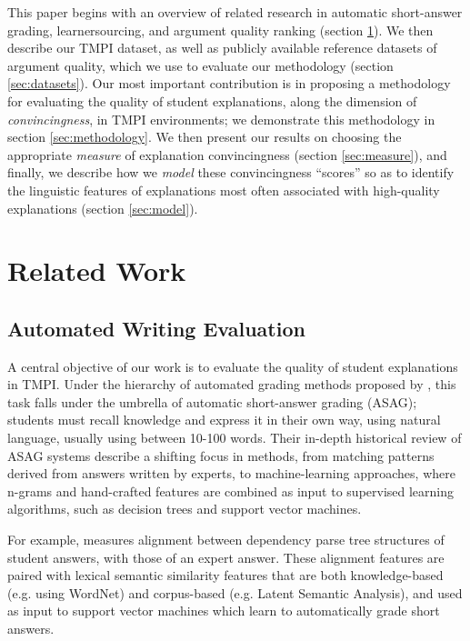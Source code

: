 \documentclass[notitlepage,12pt]{jedm}
\begin{document}
This paper begins with an overview of related research in automatic 
short-answer grading, learnersourcing, and argument quality ranking (section 
\ref{sec:related_work}).
We then describe our TMPI dataset, as well as publicly available reference 
datasets of argument quality, which we use to evaluate our methodology (section 
\ref{sec:datasets}).
Our most important contribution is in proposing a methodology for evaluating 
the quality of student explanations, along the dimension of 
\textit{convincingness}, in TMPI environments; we demonstrate this methodology 
in section \ref{sec:methodology}.
We then present our results on choosing the appropriate \textit{measure} of 
explanation convincingness (section \ref{sec:measure}), and finally, we 
describe how we \textit{model} these convincingness ``scores'' so as to 
identify the linguistic features of explanations most often associated with 
high-quality explanations (section \ref{sec:model}).

\section{Related Work}\label{sec:related_work}


\subsection{Automated Writing Evaluation}

A central objective of our work is to evaluate the quality of student 
explanations in TMPI.
Under the hierarchy of automated grading methods proposed by  
\cite{burrows_eras_2015}, this task falls under the umbrella of automatic 
short-answer grading (ASAG); students must recall knowledge and express it 
in their own way, using natural language, usually using between 10-100 words. 
Their in-depth historical review of ASAG systems describe a shifting focus in 
methods, from matching patterns derived from answers written by experts, to 
machine-learning approaches, where n-grams and hand-crafted features are 
combined as input to supervised learning algorithms, such as decision trees and 
support vector machines.

For example, \cite{mohler_learning_2011} measures alignment between dependency 
parse tree structures of student answers, with those of an expert answer.
These alignment features are paired with lexical semantic similarity features 
that are both knowledge-based (e.g. using WordNet) and corpus-based (e.g. 
Latent Semantic Analysis), and used as input to support vector machines which 
learn to automatically grade short answers.
\end{document}
